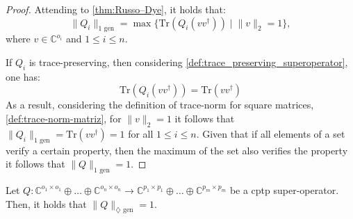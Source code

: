 \begin{proof}
Attending to \autoref{thm:Russo–Dye}, it holds that:
\begin{equation}
  \lVert Q_i \rVert_{1 \text{ gen}} = \max \{ \text{Tr}\left(Q_i(vv^{\dag}) \right) \mid \lVert v \rVert_{2}=1 \},
\end{equation}
where $v \in \mathbb{C}^{o_i}$ and $1 \leq i \leq n$.


If $Q_i$ is trace-preserving, then considering \autoref{def:trace_preserving_superoperator}, one has:
\begin{equation}
\text{Tr} (Q_i(v v^{\dag})) =  \text{Tr} (v v^{\dag})
\end{equation}
As a result, considering the definition of trace-norm for square matrices, \autoref{def:trace-norm-matriz}, for $\|v\|_2 = 1$  it follows that $\lVert Q_i \rVert_{1 \text{ gen}} = \text{Tr} (v v^{\dag}) = 1$ for all $1 \leq i \leq n$. Given that if all elements of a set verify a certain property, then the maximum of the set also verifies the property it follows that $\lVert Q \rVert_{1 \text{ gen}} = 1$.

\end{proof}

\begin{corollary} \label{cor:gen_diamond_cptp_norm}
  Let  $Q: \mathbb{C}^{o_1 \times o_1} \oplus \ldots \oplus \mathbb{C}^{o_n \times o_n}  \rightarrow \mathbb{C}^{p_1 \times p_1} \oplus \ldots \oplus  \mathbb{C}^{p_m \times p_m}$ be a \acrshort{cptp} super-operator. Then, it holds that $\lVert Q \rVert_{\diamondsuit \text{ gen}} = 1$.
\end{corollary}


